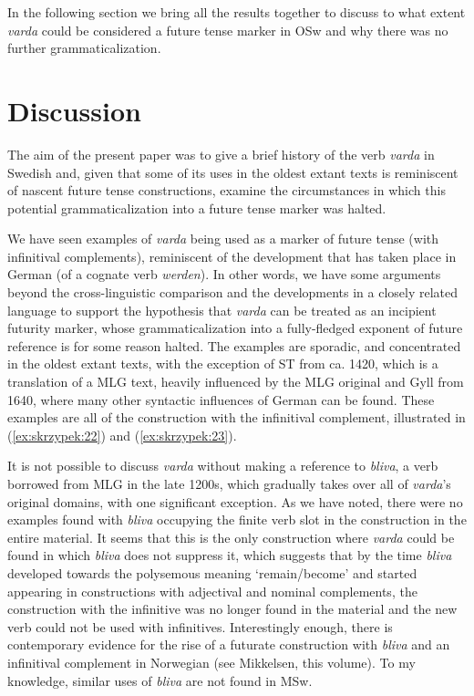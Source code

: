 \documentclass[output=paper,colorlinks,citecolor=brown]{langscibook}
\begin{document}
In the following section we bring all the results together to discuss to what extent \textit{varda} could be considered a future tense marker in OSw and why there was no further grammaticalization. 

\section{Discussion} \label{sec:skrzypek:6}
The aim of the present paper was to give a brief history of the verb \textit{varda} in Swedish and, given that some of its uses in the oldest extant texts is reminiscent of nascent future tense constructions, examine the circumstances in which this potential grammaticalization into a future tense marker was halted. 

We have seen examples of \textit{varda} being used as a marker of future tense (with infinitival complements), reminiscent of the development that has taken place in German (of a cognate verb \textit{werden}). In other words, we have some arguments beyond the cross-linguistic comparison and the developments in a closely related language to support the hypothesis that \textit{varda} can be treated as an incipient futurity marker, whose grammaticalization into a fully-fledged exponent of future reference is for some reason halted. The examples are sporadic, and concentrated in the oldest extant texts, with the exception of ST from ca. 1420, which is a translation of a MLG text, heavily influenced by the MLG original and Gyll from 1640, where many other syntactic influences of German can be found. These examples are all of the construction with the infinitival complement, illustrated in (\ref{ex:skrzypek:22}) and (\ref{ex:skrzypek:23}).

It is not possible to discuss \textit{varda} without making a reference to \textit{bliva}, a verb borrowed from MLG in the late 1200s, which gradually takes over all of \textit{varda}’s original domains, with one significant exception. As we have noted, there were no examples found with \textit{bliva} occupying the finite verb slot in the construction in the entire material. It seems that this is the only construction where \textit{varda} could be found in which \textit{bliva} does not suppress it, which suggests that by the time \textit{bliva} developed towards the polysemous meaning ‘remain/become’ and started appearing in constructions with adjectival and nominal complements, the construction with the infinitive was no longer found in the material and the new verb could not be used with infinitives. Interestingly enough, there is contemporary evidence for the rise of a futurate construction with \textit{bliva} and an infinitival complement in Norwegian (see Mikkelsen, this volume). To my knowledge, similar uses of \textit{bliva} are not found in MSw. 
\end{document}
